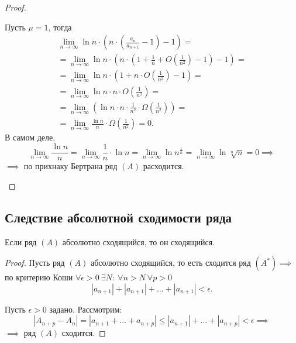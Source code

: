 \begin{proof}
\begin{enumerate}
              Пусть $\mu = 1$, тогда
              \begin{multline*}
                  \underset{n\rightarrow\infty}{\lim}\ln n \cdot \left(n \cdot \left(\frac{a_n}{a_{n+1}} - 1\right) - 1\right) = \\
                  = \underset{n\rightarrow\infty}{\lim}\ln n \cdot \left(n \cdot \left(1 + \frac{1}{n} + O\left(\frac{1}{n^2}\right) - 1\right) - 1\right) = \\
                  = \underset{n\rightarrow\infty}{\lim}\ln n \cdot \left(1 + n \cdot O\left(\frac{1}{n^2}\right) - 1\right) = \\
                  = \underset{n\rightarrow\infty}{\lim}\ln n \cdot n \cdot O\left(\frac{1}{n^2}\right) = \\
                  = \underset{n\rightarrow\infty}{\lim}\left(\ln n \cdot n \cdot \frac{1}{n^2} \cdot \Omega\left(\frac{1}{n^2}\right)\right) = \\
                  = \underset{n\rightarrow\infty}{\lim}\frac{\ln n}{n} \cdot \Omega\left(\frac{1}{n^2}\right) = 0.
              \end{multline*}
              В самом деле,
              \[
                  \underset{n\rightarrow\infty}{\lim}\frac{\ln n}{n} = \underset{n\rightarrow\infty}{\lim} \frac{1}{n} \cdot \ln n = \underset{n\rightarrow\infty}{\lim}\ln n^{\frac{1}{n}} = \underset{n\rightarrow\infty}{\lim} \ln \sqrt[n]{n} = 0 \implies
              \]
              $\implies$ по прихнаку Бертрана ряд $(A)$ расходится.
    \end{enumerate}
\end{proof}

\setcounter{subsection}{49}

\subsection{Следствие абсолютной сходимости ряда}

\begin{statement}
    Если ряд $(A)$ абсолютно сходящийся, то он сходящийся.
\end{statement}

\begin{proof}
    Пусть ряд $(A)$ абсолютно сходящийся, то есть сходится ряд $(A^*) \implies$ по критерию Коши $\forall \epsilon > 0 \ \exists N: \ \forall n > N \ \forall p > 0$
    \[
        |a_{n+1}| + |a_{n+1}| + \ldots + |a_{n+1}| < \epsilon.
    \]

    Пусть $\epsilon > 0$ задано. Рассмотрим:
    \[
        |A_{n+p} - A_n| = |a_{n+1} + \ldots + a_{n+p}| \leqslant |a_{n+1}| + \ldots + |a_{n+p}| < \epsilon \implies
    \]
    $\implies$ ряд $(A)$ сходится.
\end{proof}

